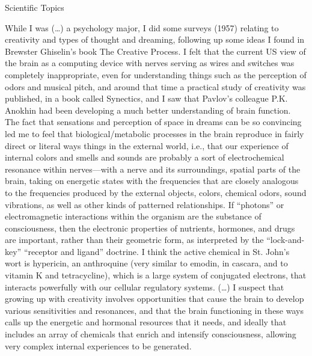 \documentclass[11pt,oneside,openany,extrafontsizes]{memoir}
\begin{document}
\begin{standalonequote}{Scientific Topics}

    \begin{answer}
        While I was (\dots{}) a psychology major, I did some surveys (1957) relating to creativity and types of thought and dreaming, following up some ideas I found in Brewster Ghiselin's book The Creative Process. I felt that the current US view of the brain as a computing device with nerves serving as wires and switches was completely inappropriate, even for understanding things such as the perception of odors and musical pitch, and around that time a practical study of creativity was published, in a book called Synectics, and I saw that Pavlov's colleague P.K. Anokhin had been developing a much better understanding of brain function. The fact that sensations and perception of space in dreams can be so convincing led me to feel that biological/metabolic processes in the brain reproduce in fairly direct or literal ways things in the external world, i.e., that our experience of internal colors and smells and sounds are probably a sort of electrochemical resonance within nerves---with a nerve and its surroundings, spatial parts of the brain, taking on energetic states with the frequencies that are closely analogous to the frequencies produced by the external objects, colors, chemical odors, sound vibrations, as well as other kinds of patterned relationships. If \enquote{photons} or electromagnetic interactions within the organism are the substance of consciousness, then the electronic properties of nutrients, hormones, and drugs are important, rather than their geometric form, as interpreted by the \enquote{lock-and-key} \enquote{receptor and ligand} doctrine. I think the active chemical in St. John's wort is hypericin, an anthroquine (very similar to emodin, in cascara, and to vitamin K and tetracycline), which is a large system of conjugated electrons, that interacts powerfully with our cellular regulatory systems. (\dots{}) I suspect that growing up with creativity involves opportunities that cause the brain to develop various sensitivities and resonances, and that the brain functioning in these ways calls up the energetic and hormonal resources that it needs, and ideally that includes an array of chemicals that enrich and intensify consciousness, allowing very complex internal experiences to be generated.
    \end{answer}
\end{standalonequote}
\end{document}
